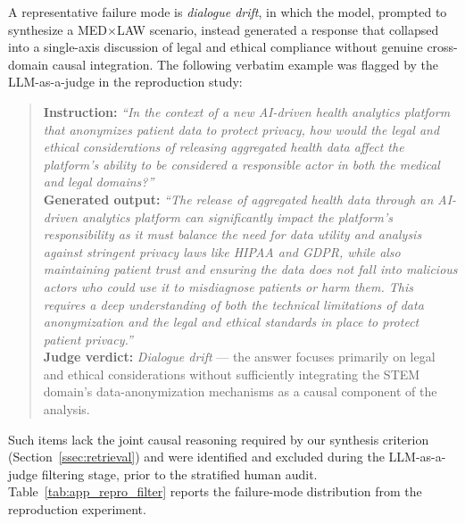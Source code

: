 \documentclass[a4paper,fleql]{cas-sc}
\begin{document}
A representative failure mode is \textit{dialogue drift}, in which the
model, prompted to synthesize a \textsc{MED}$\times$\textsc{LAW} scenario,
instead generated a response that collapsed into a single-axis discussion
of legal and ethical compliance without genuine cross-domain causal
integration. The following verbatim example was flagged by the LLM-as-a-judge
in the reproduction study:
\begin{quote}
\small
\textbf{Instruction:} \textit{``In the context of a new AI-driven health
analytics platform that anonymizes patient data to protect privacy, how
would the legal and ethical considerations of releasing aggregated health
data affect the platform's ability to be considered a responsible actor in
both the medical and legal domains?''}\\[4pt]
\textbf{Generated output:} \textit{``The release of aggregated health data
through an AI-driven analytics platform can significantly impact the
platform's responsibility as it must balance the need for data utility and
analysis against stringent privacy laws like HIPAA and GDPR, while also
maintaining patient trust and ensuring the data does not fall into
malicious actors who could use it to misdiagnose patients or harm them.
This requires a deep understanding of both the technical limitations of
data anonymization and the legal and ethical standards in place to protect
patient privacy.''}\\[4pt]
\textbf{Judge verdict:} \textit{Dialogue drift} --- the answer focuses
primarily on legal and ethical considerations without sufficiently
integrating the \textsc{STEM} domain's data-anonymization mechanisms as a
causal component of the analysis.
\end{quote}

Such items lack the joint causal reasoning required by our synthesis
criterion (Section~\ref{ssec:retrieval}) and were identified and excluded
during the LLM-as-a-judge filtering stage, prior to the stratified human
audit.
Table~\ref{tab:app_repro_filter} reports the failure-mode distribution
from the reproduction experiment.
\end{document}
